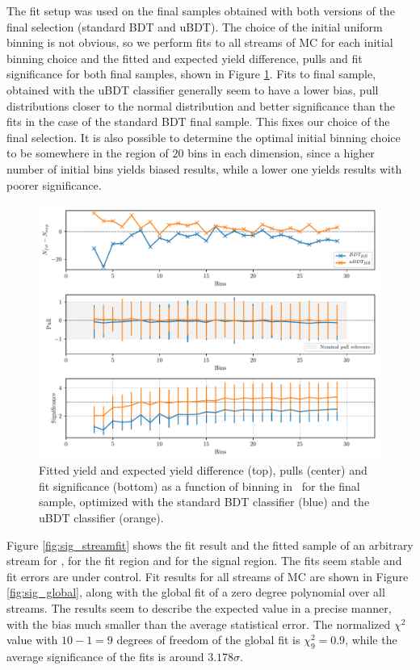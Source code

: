 The fit setup was used on the final samples obtained with both versions of the final selection (standard BDT and uBDT). The choice of the initial uniform binning is not obvious, so we perform fits to all streams of MC for each initial binning choice and the fitted and expected yield difference, pulls and fit significance for both final samples, shown in Figure \ref{fig:sig_binning}. Fits to final sample, obtained with the uBDT classifier generally seem to have a lower bias, pull distributions closer to the normal distribution and better significance than the fits in the case of the standard BDT final sample. This fixes our choice of the final selection. It is also possible to determine the optimal initial binning choice to be somewhere in the region of $20$ bins in each dimension, since a higher number of initial bins yields biased results, while a lower one yields results with poorer significance.

\begin{figure}[H]
	\centering
	\captionsetup{width=0.8\linewidth}
	\includegraphics[width=\linewidth]{fig/sig_binning}
	\caption{Fitted yield and expected yield difference (top), pulls (center) and fit significance (bottom) as a function of binning in \vars~for the final sample, optimized with the standard BDT classifier (blue) and the uBDT classifier (orange).}
	\label{fig:sig_binning}
\end{figure}

Figure \ref{fig:sig_streamfit} shows the fit result and the fitted sample of an arbitrary stream for \vars, for the fit region and for the signal region. The fits seem stable and fit errors are under control. Fit results for all streams of MC are shown in Figure \ref{fig:sig_global}, along with the global fit of a zero degree polynomial over all streams. The results seem to describe the expected value in a precise manner, with the bias much smaller than the average statistical error. The normalized $\chi^2$ value with $10-1=9$ degrees of freedom of the global fit is $\chi^2_9 = 0.9$, while the average significance of the fits is around $3.178 \sigma$.

